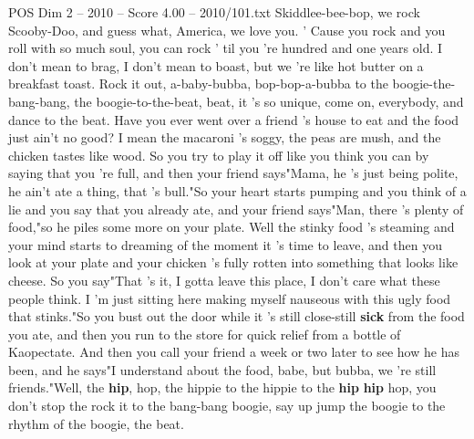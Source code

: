 \begin{textsample}{POS Dim 2 – 2010 – Score 4.00 – 2010/101.txt}
Skiddlee-bee-bop, we rock Scooby-Doo, and guess what, America, we love you. ' Cause you rock and you roll with so much soul, you can rock ' til you 're hundred and one years old.
I don't mean to brag, I don't mean to boast, but we 're like hot butter on a breakfast toast.
Rock it out, a-baby-bubba, bop-bop-a-bubba to the boogie-the-bang-bang, the boogie-to-the-beat, beat, it 's so unique, come on, everybody, and dance to the beat.
Have you ever went over a friend 's house to eat and the food just ain't no good?
I mean the macaroni 's soggy, the peas are mush, and the chicken tastes like wood.
So you try to play it off like you think you can by saying that you 're full, and then your friend says"Mama, he 's just being polite, he ain't ate a thing, that 's bull."So your heart starts pumping and you think of a lie and you say that you already ate, and your friend says"Man, there 's plenty of food,"so he piles some more on your plate.
Well the stinky food 's steaming and your mind starts to dreaming of the moment it 's time to leave, and then you look at your plate and your chicken 's fully rotten into something that looks like cheese.
So you say"That 's it, I gotta leave this place, I don't care what these people think.
I 'm just sitting here making myself nauseous with this ugly food that stinks."So you bust out the door while it 's still close-still \textbf{sick} from the food you ate, and then you run to the store for quick relief from a bottle of Kaopectate.
And then you call your friend a week or two later to see how he has been, and he says"I understand about the food, babe, but bubba, we 're still friends."Well, the \textbf{hip}, hop, the hippie to the hippie to the \textbf{hip} \textbf{hip} hop, you don't stop the rock it to the bang-bang boogie, say up jump the boogie to the rhythm of the boogie, the beat.

\end{textsample}
